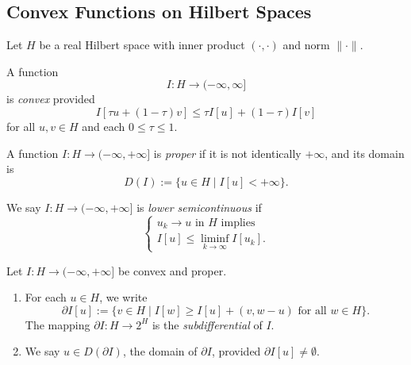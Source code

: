 \subsection{Convex Functions on Hilbert Spaces}
\label{sec:convex-functions-hilbert-spaces}

Let $H$ be a real Hilbert space with inner product $(\cdot,\cdot)$ and norm $\|\cdot\|$.

\begin{definition}
\label{def:convex-function-hilbert-space}
A function
\[
I : H \to (-\infty, \infty]
\]
is \textit{convex} provided
\[
I[\tau u + (1-\tau)v] \le \tau I[u] + (1-\tau)I[v]
\]
for all $u, v \in H$ and each $0 \le \tau \le 1$.
\end{definition}

A function $I:H\to(-\infty,+\infty]$ is \textit{proper} if it is not identically $+\infty$, and its domain is
\[
D(I):=\{u\in H\mid I[u]<+\infty\}.
\]

\begin{definition}
\label{def:lower-semicontinuous-hilbert-functional}
We say $I : H \to (-\infty, +\infty]$ is \textit{lower semicontinuous} if
\[
\begin{cases} u_k \to u \text{ in } H \text{ implies} \\ I[u] \le \liminf_{k \to \infty} I[u_k]. \end{cases}
\]
\end{definition}

\begin{definition}[Subdifferential]
\label{def:subdifferential-hilbert}
Let $I : H \to (-\infty, +\infty]$ be convex and proper.
\begin{enumerate}
\item[(i)] For each $u \in H$, we write
\[
\partial I[u] := \{v \in H \mid I[w] \ge I[u] + (v, w-u) \text{ for all } w \in H\}.
\tag{1}
\]
The mapping $\partial I : H \to 2^H$ is the \textit{subdifferential} of $I$.
\item[(ii)] We say $u \in D(\partial I)$, the domain of $\partial I$, provided $\partial I[u] \ne \emptyset$.
\end{enumerate}
\end{definition}

